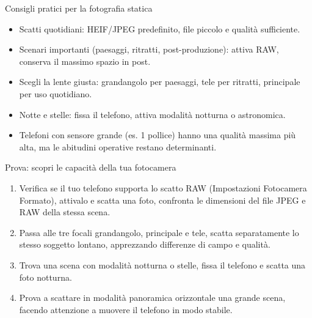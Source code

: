 \begin{tcbinfo}{Consigli pratici per la fotografia statica}
\begin{itemize}
  \item Scatti quotidiani: HEIF/JPEG predefinito, file piccolo e qualità sufficiente.
  \item Scenari importanti (paesaggi, ritratti, post-produzione): attiva RAW, conserva il massimo spazio in post.
  \item Scegli la lente giusta: grandangolo per paesaggi, tele per ritratti, principale per uso quotidiano.
  \item Notte e stelle: fissa il telefono, attiva modalità notturna o astronomica.
  \item Telefoni con sensore grande (es. 1 pollice) hanno una qualità massima più alta, ma le abitudini operative restano determinanti.
\end{itemize}

\end{tcbinfo}

\begin{tcbpractice}{Prova: scopri le capacità della tua fotocamera}
\begin{enumerate}
  \item Verifica se il tuo telefono supporta lo scatto RAW (Impostazioni Fotocamera Formato), attivalo e scatta una foto, confronta le dimensioni del file JPEG e RAW della stessa scena.
  \item Passa alle tre focali grandangolo, principale e tele, scatta separatamente lo stesso soggetto lontano, apprezzando differenze di campo e qualità.
  \item Trova una scena con modalità notturna o stelle, fissa il telefono e scatta una foto notturna.
  \item Prova a scattare in modalità panoramica orizzontale una grande scena, facendo attenzione a muovere il telefono in modo stabile.
\end{enumerate}

\end{tcbpractice}
